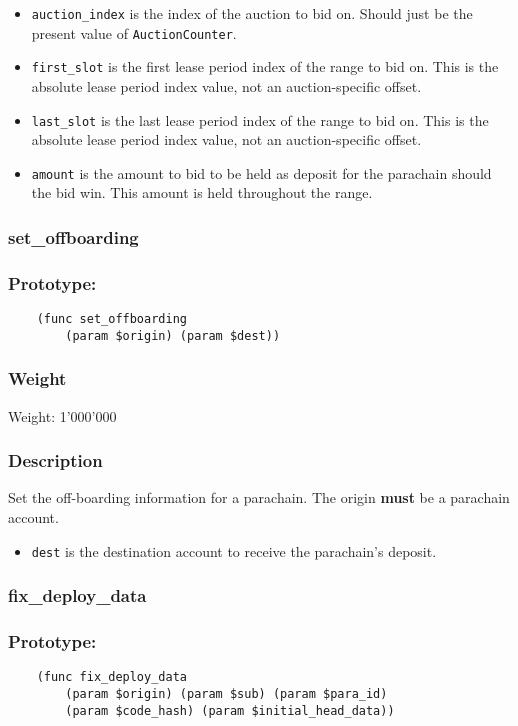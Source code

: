 \documentclass[11pt,a4paper]{article}
\begin{document}
\begin{itemize}
\item \verb|auction_index| is the index of the auction to bid on. Should just be the present value of \verb|AuctionCounter|.
\item \verb|first_slot| is the first lease period index of the range to bid on. This is the absolute lease period index value, not an auction-specific offset.
\item \verb|last_slot| is the last lease period index of the range to bid on. This is the absolute lease period index value, not an auction-specific offset.
\item \verb|amount| is the amount to bid to be held as deposit for the parachain should the bid win. This amount is held throughout the range.
\end{itemize}

\subsubsection{set\_offboarding}
\subsubsection*{Prototype:}
\begin{verbatim}
    (func set_offboarding
        (param $origin) (param $dest))
\end{verbatim}
\subsubsection*{Weight}
Weight: 1'000'000
\subsubsection*{Description}
Set the off-boarding information for a parachain. The origin \textbf{must} be a parachain account.

\begin{itemize}
\item \verb|dest| is the destination account to receive the parachain's deposit.
\end{itemize}

\subsubsection{fix\_deploy\_data}
\subsubsection*{Prototype:}
\begin{verbatim}
    (func fix_deploy_data
        (param $origin) (param $sub) (param $para_id)
        (param $code_hash) (param $initial_head_data))
\end{verbatim}
\end{document}
